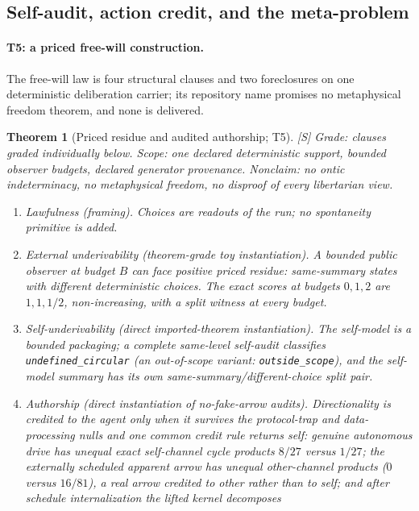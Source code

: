 \documentclass[11pt]{article}
\newcommand{\gradeS}{\textsf{[S]}}
\newtheorem{theorem}{Theorem}[section]
\theoremstyle{definition}
\begin{document}
\subsection{Self-audit, action credit, and the meta-problem}
\label{sec:selfaudit}


\paragraph{T5: a priced free-will construction.}
The free-will law is four structural clauses and two foreclosures on one
deterministic deliberation carrier; its repository name promises no
metaphysical freedom theorem, and none is delivered.

\begin{theorem}[Priced residue and audited authorship; T5]
\label{thm:t5}
\gradeS{} \emph{Grade:} clauses graded individually below. \emph{Scope:} one
declared deterministic support, bounded observer budgets, declared generator
provenance. \emph{Nonclaim:} no ontic indeterminacy, no metaphysical
freedom, no disproof of every libertarian view.
\begin{enumerate}
\item \emph{Lawfulness} (framing). Choices are readouts of the run; no
spontaneity primitive is added.
\item \emph{External underivability} (theorem-grade toy instantiation). A
bounded public observer at budget $B$ can face positive priced residue:
same-summary states with different deterministic choices. The exact scores at
budgets $0,1,2$ are $1, 1, 1/2$, non-increasing, with a split witness at every
budget.
\item \emph{Self-underivability} (direct imported-theorem instantiation). The
self-model is a bounded packaging; a complete same-level self-audit
classifies \texttt{undefined\_circular} (an out-of-scope variant:
\texttt{outside\_scope}), and the self-model summary has its own
same-summary/different-choice split pair.
\item \emph{Authorship} (direct instantiation of no-fake-arrow audits).
Directionality is credited to the agent only when it survives the
protocol-trap and data-processing nulls and one common credit rule returns
\emph{self}: genuine autonomous drive has unequal exact self-channel cycle
products $8/27$ versus $1/27$; the externally scheduled apparent arrow has
unequal \emph{other}-channel products ($0$ versus $16/81$), a real arrow
credited to other rather than to self; and after schedule internalization the lifted kernel decomposes

\end{enumerate}
\end{theorem}
\end{document}
